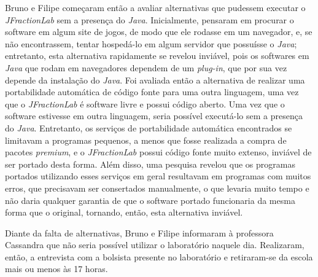 Bruno e Filipe começaram então a avaliar alternativas que pudessem executar o \textit{JFractionLab} sem a presença do \textit{Java}. Inicialmente, pensaram em procurar o software em algum site de jogos, de modo que ele rodasse em um navegador, e, se não encontrassem, tentar hospedá-lo em algum servidor que possuísse o \textit{Java}; entretanto, esta alternativa rapidamente se revelou inviável, pois os softwares em \textit{Java} que rodam em navegadores dependem de um \textit{plug-in}, que por sua vez depende da instalação do \textit{Java}. Foi avaliada então a alternativa de realizar uma portabilidade automática de código fonte para uma outra linguagem, uma vez que o \textit{JFractionLab} é software livre e possui código aberto. Uma vez que o software estivesse em outra linguagem, seria possível executá-lo sem a presença do \textit{Java}. Entretanto, os serviços de portabilidade automática encontrados se limitavam a programas pequenos, a menos que fosse realizada a compra de pacotes \textit{premium}, e o \textit{JFractionLab} possui código fonte muito extenso, inviável de ser portado desta forma. Além disso, uma pesquisa revelou que os programas portados utilizando esses serviços em geral resultavam em programas com muitos erros, que precisavam ser consertados manualmente, o que levaria muito tempo e não daria qualquer garantia de que o software portado funcionaria da mesma forma que o original, tornando, então, esta alternativa inviável.

Diante da falta de alternativas, Bruno e Filipe informaram à professora Cassandra que não seria possível utilizar o laboratório naquele dia. Realizaram, então, a entrevista com a bolsista presente no laboratório e retiraram-se da escola mais ou menos às 17 horas.
